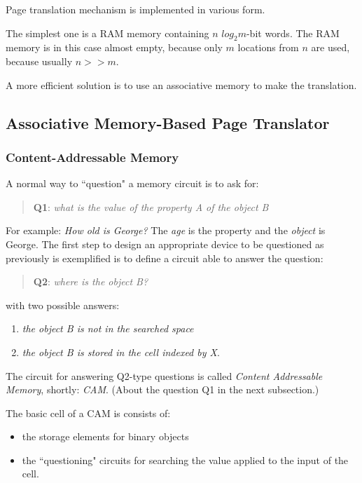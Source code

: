 Page translation mechanism is implemented in various form.

The simplest one is a RAM memory containing $n$ $log_2 m$-bit words. The RAM memory is in this case almost empty, because only $m$ locations from  $n$ are used, because usually $n>> m$.

A more efficient solution is to use an associative memory to make the translation.

\subsection{Associative Memory-Based Page Translator}

\subsubsection{Content-Addressable Memory}


A normal way to ``question" a memory circuit is to ask for:
\begin{quote}
{\bf Q1}: {\em what is the value of the property A of the object B}
\end{quote}
For example: {\em How old is George?} The {\em age} is the
property and the {\em object} is George. The first step to design
an appropriate device to be questioned as previously is
exemplified is to define a circuit able to answer the question:
\begin{quote}
{\bf Q2}: {\em where is the object B?}
\end{quote}
with two possible answers:
\begin{enumerate}
    \item {\em the object B is not in the searched space}
    \item {\em the object B is stored in the cell indexed by X}.
\end{enumerate}
The circuit for answering Q2-type questions is called {\em Content
Addressable Memory}, shortly: {\em CAM}. (About the question Q1 in
the next subsection.)

The basic cell of a CAM is consists of:
\begin{itemize}
    \item the storage elements for binary objects
    \item the ``questioning" circuits for searching the value
    applied to the input of the cell.
\end{itemize}


